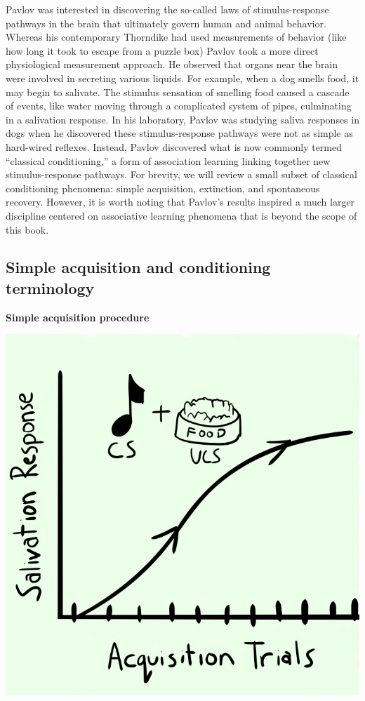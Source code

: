 \documentclass[
  oneside,
  12pt]{crumpbook}
\newenvironment{floatrightbox50}{%
  \wrapfigure{R}{.5\textwidth}%
  }{%
  \endwrapfigure}
\begin{document}
Pavlov was interested in discovering the so-called laws of stimulus-response pathways in the brain that ultimately govern human and animal behavior. Whereas his contemporary Thorndike had used measurements of behavior (like how long it took to escape from a puzzle box) Pavlov took a more direct physiological measurement approach. He observed that organs near the brain were involved in secreting various liquids. For example, when a dog smells food, it may begin to salivate. The stimulus sensation of smelling food caused a cascade of events, like water moving through a complicated system of pipes, culminating in a salivation response. In his laboratory, Pavlov was studying saliva responses in dogs when he discovered these stimulus-response pathways were not as simple as hard-wired reflexes. Instead, Pavlov discovered what is now commonly termed ``classical conditioning,'' a form of association learning linking together new stimulus-response pathways. For brevity, we will review a small subset of classical conditioning phenomena: simple acquisition, extinction, and spontaneous recovery. However, it is worth noting that Pavlov's results inspired a much larger discipline centered on associative learning phenomena that is beyond the scope of this book.

\hypertarget{simple-acquisition-and-conditioning-terminology}{%
\subsection{Simple acquisition and conditioning terminology}\label{simple-acquisition-and-conditioning-terminology}}

\begin{floatrightbox50}
\textbf{Simple acquisition procedure}

\includegraphics[width=1\linewidth]{imgs/Conditioning_Acquisition}

\end{floatrightbox50}
\end{document}

